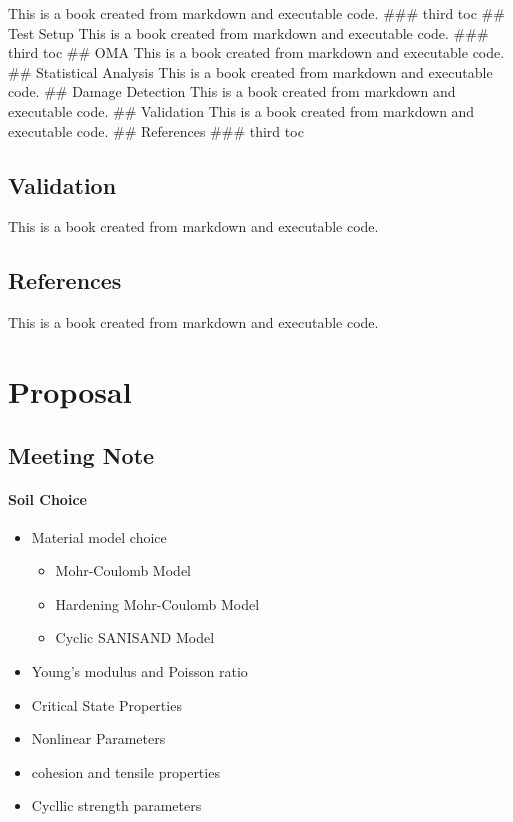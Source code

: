 \documentclass[
  letterpaper,
  DIV=11,
  numbers=noendperiod]{scrreprt}
\providecommand{\tightlist}{%
  \setlength{\itemsep}{0pt}\setlength{\parskip}{0pt}}\usepackage{longtable,booktabs,array}
\begin{document}
This is a book created from markdown and executable code. \#\#\# third
toc \#\# Test Setup This is a book created from markdown and executable
code. \#\#\# third toc \#\# OMA This is a book created from markdown and
executable code. \#\# Statistical Analysis This is a book created from
markdown and executable code. \#\# Damage Detection This is a book
created from markdown and executable code. \#\# Validation This is a
book created from markdown and executable code. \#\# References \#\#\#
third toc

\hypertarget{validation-1}{%
\chapter{Validation}\label{validation-1}}

This is a book created from markdown and executable code.

\hypertarget{references-2}{%
\chapter{References}\label{references-2}}

This is a book created from markdown and executable code.

\part{Proposal}

\hypertarget{meeting-note}{%
\chapter{Meeting Note}\label{meeting-note}}

\hypertarget{soil-choice}{%
\subsection{Soil Choice}\label{soil-choice}}

\begin{itemize}
\tightlist
\item
  Material model choice

  \begin{itemize}
  \tightlist
  \item
    Mohr-Coulomb Model
  \item
    Hardening Mohr-Coulomb Model
  \item
    Cyclic SANISAND Model
  \end{itemize}
\item
  Young's modulus and Poisson ratio
\item
  Critical State Properties
\item
  Nonlinear Parameters
\item
  cohesion and tensile properties
\item
  Cycllic strength parameters
\end{itemize}
\end{document}
